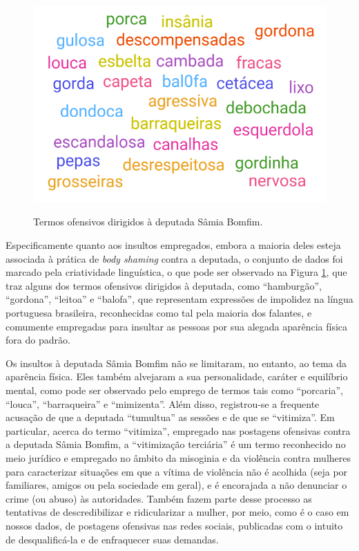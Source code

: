 \documentclass[portuguese]{textolivre}
\begin{document}
\begin{figure}[h!]
\centering
\begin{minipage}{.5\textwidth}
\includegraphics[width=\textwidth]{Fig3.png}
\caption{Termos ofensivos dirigidos à deputada Sâmia Bomfim.} 
\label{fig-1}
\end{minipage}
\end{figure}


Especificamente quanto aos insultos empregados, embora a maioria deles esteja associada à prática de \textit{body shaming} contra a deputada, o conjunto de dados foi marcado pela criatividade linguística, o que pode ser observado na Figura \ref{fig-1}, que traz alguns dos termos ofensivos dirigidos à deputada, como ``hamburgão'', ``gordona'', ``leitoa'' e ``balofa'', que representam expressões de impolidez na língua portuguesa brasileira, reconhecidas como tal pela maioria dos falantes, e comumente empregadas para insultar as pessoas por sua alegada aparência física fora do padrão.

Os insultos à deputada Sâmia Bomfim não se limitaram, no entanto, ao tema da aparência física. Eles também alvejaram a sua personalidade, caráter e equilíbrio mental, como pode ser observado pelo emprego de termos tais como ``porcaria'', ``louca'', ``barraqueira'' e ``mimizenta''. Além disso, registrou-se a frequente acusação de que a deputada ``tumultua'' as sessões e de que se ``vitimiza''. Em particular, acerca do termo ``vitimiza'', empregado nas postagens ofensivas contra a deputada Sâmia Bomfim, a ``vitimização terciária'' é um termo reconhecido no meio jurídico e empregado no âmbito da misoginia e da violência contra mulheres para caracterizar situações em que a vítima de violência não é acolhida (seja por familiares, amigos ou pela sociedade em geral), e é encorajada a não denunciar o crime (ou abuso) às autoridades. Também fazem parte desse processo as tentativas de descredibilizar e ridicularizar a mulher, por meio, como é o caso em nossos dados, de postagens ofensivas nas redes sociais, publicadas com o intuito de desqualificá-la e de enfraquecer suas demandas.
\end{document}
